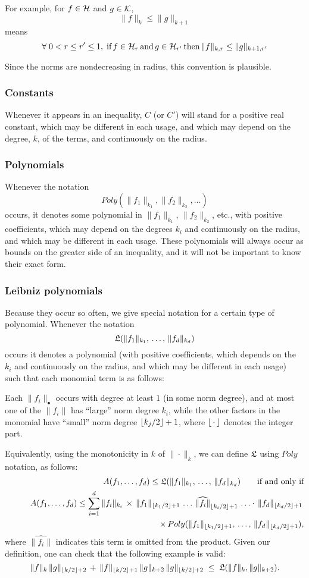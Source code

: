 \documentclass{article}
\begin{document}
For example, for $f\in\mathcal{H}$ and $g\in\mathcal{K}$,
$$\|f\|_k \leq \|g\|_{k+1}$$
means
$$\forall\; 0<r\leq r'\leq1,\;\textnormal{if}\,f\in\mathcal{H}_r\,\textnormal{and}\, g\in\mathcal{H}_{r'}\,\textnormal{then}\, \|f\|_{k,r}\leq\|g\|_{k+1,r'}$$
\begin{rem}
Since the norms are nondecreasing in radius, this convention is plausible.
\end{rem}
\subsubsection*{Constants}
Whenever it appears in an inequality, $C$ (or $C'$) will stand for a positive real constant, which may be different in each usage, and which may depend on the degree, $k$, of the terms, and continuously on the radius.
\subsubsection*{Polynomials}
Whenever the notation $$Poly(\|f_1\|_{k_1},\|f_2\|_{k_2},\ldots)$$ occurs, it denotes some polynomial in $\|f_1\|_{k_1}$, $\|f_2\|_{k_2}$, etc., with positive coefficients, which may depend on the degrees $k_i$ and continuously on the radius, and which may be different in each usage.  These polynomials will always occur as bounds on the greater side of an inequality, and it will not be important to know their exact form.
\subsubsection*{Leibniz polynomials}
Because they occur so often, we give special notation for a certain type of polynomial.  Whenever the notation
$$\mathfrak{L}(\|f_1\|_{k_1},\, \ldots,\, \|f_d\|_{k_d})$$
occurs it denotes a polynomial (with positive coefficients, which depends on the $k_i$ and continuously on the radius, and which may be different in each usage) such that each monomial term is as follows:

Each $\|f_i\|_\bullet$ occurs with degree at least $1$ (in some norm degree), and at most one of the $\|f_i\|$ has ``large'' norm degree $k_i$, while the other factors in the monomial have ``small'' norm degree $\left\lfloor k_j/2 \right\rfloor+1$, where $\left\lfloor \,\cdot\, \right\rfloor$ denotes the integer part.

Equivalently, using the monotonicity in $k$ of $\|\cdot\|_k$, we can define $\mathfrak{L}$ using $Poly$ notation, as follows:
\begin{eqnarray*}
& & A(f_1, \ldots, f_d) \leq \mathfrak{L}(\|f_1\|_{k_1},\, \ldots,\, \|f_d\|_{k_d}) \qquad\textnormal{if and only if}\notag \\
& & \qquad A(f_1,\ldots,f_d) \leq {\sum_{i=1}^d \|f_i\|_{k_i}\,\times\, \|f_1\|_{\left\lfloor k_1/2 \right\rfloor+1}\, \ldots\, \widehat{\|f_i\|}_{\left\lfloor k_i/2 \right\rfloor+1}\, \ldots\cdot\, \|f_d\|_{\left\lfloor k_d/2 \right\rfloor+1}}\, \notag \\
& & \qquad\qquad \times\, {Poly(\|f_1\|_{\left\lfloor k_1/2 \right\rfloor+1},\, \ldots,\, \|f_d\|_{\left\lfloor k_d/2 \right\rfloor+1})},
\end{eqnarray*}
where $\widehat{\|f_i\|}$ indicates this term is omitted from the product.  Given our definition, one can check that the following example is valid:
$$\|f\|_k\, \|g\|_{\left\lfloor k/2 \right\rfloor+2}\, +\, \|f\|_{\left\lfloor k/2 \right\rfloor+1}\, \|g\|_{k+2}\, \|g\|_{\left\lfloor k/2 \right\rfloor+2} \;\leq\; \mathfrak{L}(\|f\|_k,\|g\|_{k+2}).$$
\end{document}
